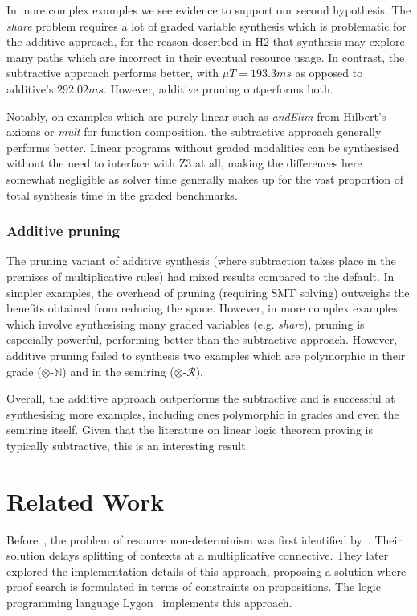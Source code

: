 In more complex examples we see evidence to support our second hypothesis. The
\textit{share} problem requires a lot of graded variable synthesis which is
problematic for the additive approach, for the reason described in H2 that synthesis 
may explore many paths which are incorrect in their eventual resource usage. In
contrast, the subtractive approach performs better, with $\mu{T} =
193.3\textit{ms}$ as opposed to additive's $292.02\textit{ms}$. However,
additive pruning outperforms both.

Notably, on examples which are purely linear such as \textit{andElim} from
Hilbert's axioms or \textit{mult} for function composition, the subtractive
approach generally performs better. Linear programs without graded modalities
can be synthesised without the need to interface with Z3 at all, making the
differences here somewhat negligible as solver time generally makes up for the
vast proportion of total synthesis time in the graded benchmarks.

\subsubsection{Additive pruning}
The pruning variant of additive synthesis (where subtraction
takes place in the premises of multiplicative rules) had mixed results
compared to the default. In simpler examples, the overhead of pruning
(requiring SMT solving) outweighs
the benefits obtained from reducing the space. However, in more
complex examples which involve synthesising many graded variables (e.g. \textit{share}), pruning is
especially powerful, performing better than the subtractive
approach. However, additive pruning failed to synthesis two
 examples which are polymorphic in their grade
 ($\otimes$-$\mathbb{N}$) and in the semiring ($\otimes$-$\mathcal{R}$).


Overall, the additive approach outperforms the subtractive and is successful at
synthesising more examples, including ones polymorphic in grades and even the
semiring itself. Given that the literature on linear logic theorem proving is
typically subtractive, this is an interesting result. 

\section{Related Work}
\label{sec:linear-base-related}
Before~\citet{HODAS1994327}, the problem of resource
non-determinism was first identified by~\citet{harlandpym}. Their
solution delays splitting of contexts at a multiplicative connective. They later
explored the implementation details of this approach, proposing a solution where
proof search is formulated in terms of constraints on propositions. The logic
programming language Lygon~\citep{lygon} implements this approach.

